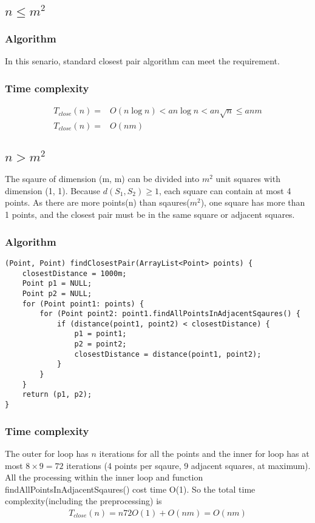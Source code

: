 \documentclass{article}
\begin{document}
\subsection{$n \leq m^2$}
\subsubsection{Algorithm}
In this senario, standard closest pair algorithm can meet the requirement.
\subsubsection{Time complexity}
\begin{align*}
T_{close}(n) =& O (n \log n) < a n \log n < a n \sqrt{n} \leq a n m\\
T_{close}(n) =& O(nm)
\end{align*}
\subsection{$n > m^2$}
The sqaure of dimension (m, m) can be divided into $m^2$ unit squares with
dimension (1, 1). Because $d(S_1, S_2) \geq 1$, each square can contain at most
4 points. As there are more points(n) than sqaures($m^2$), one square has more
than 1 points, and the closest pair must be in the same square or adjacent squares.
\subsubsection{Algorithm}
\begin{lstlisting}
(Point, Point) findClosestPair(ArrayList<Point> points) {
	closestDistance = 1000m;
	Point p1 = NULL;
	Point p2 = NULL;
	for (Point point1: points) {
		for (Point point2: point1.findAllPointsInAdjacentSqaures() {
			if (distance(point1, point2) < closestDistance) {
				p1 = point1;
				p2 = point2;
				closestDistance = distance(point1, point2);
			}
		}
	}
	return (p1, p2);
}
\end{lstlisting}
\subsubsection{Time complexity}
The outer for loop has $n$ iterations for all the points and the inner for loop
has at most $8 \times 9 = 72$ iterations (4 points per sqaure, 9 adjacent
squares, at maximum). All the processing within the inner loop and function
findAllPointsInAdjacentSqaures() cost time O(1). So the total time
complexity(including the preprocessing) is
\begin{align*}
T_{close}(n) = n 72 O(1) + O(nm) = O(nm)
\end{align*}
\end{document}
